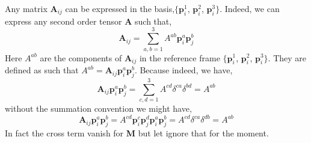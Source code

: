 Any matrix $\textbf{A}_{ij}$ can be expressed in the basis,$\{\textbf{p}^1_i$, $\textbf{p}^2_i$, $\textbf{p}^3_i\}$. 
Indeed, we can express any second order tensor $\textbf{A}$ such that, 
\begin{equation*}
    \textbf{A}_{ij} 
    = 
    \sum_{a,b=1}^{3} 
    A^{ab}
    \textbf{p}_i^a \textbf{p}_j^b
\end{equation*}
Here $A^{ab}$ are the components of $\textbf{A}_{ij}$ in the reference frame $\{\textbf{p}^1_i$, $\textbf{p}^2_i$, $\textbf{p}^3_i\}$. 
They are defined as such that $A^{ab} = \textbf{A}_{ij}\textbf{p}^a_i\textbf{p}^b_j$. 
Because indeed, we have, 
\begin{equation*}
    \textbf{A}_{ij} \textbf{p}^a_i\textbf{p}^b_j
    = 
    \sum_{c,d=1}^{3} 
    A^{cd}
    \delta^{ca}
    \delta^{bd}
    = 
    A^{ab}
\end{equation*}
without the summation convention we might have, 
\begin{equation}
    \textbf{A}_{ij} \textbf{p}^a_i\textbf{p}^b_j
    = 
    A^{cd} \textbf{p}^c_i\textbf{p}^d_j\textbf{p}^a_i\textbf{p}^b_j
    = 
    A^{cd} \delta^{ca}\delta^{db}
    = 
    A^{ab}
\end{equation}
In fact the cross term vanish for \textbf{M} but let ignore that for the moment. 

